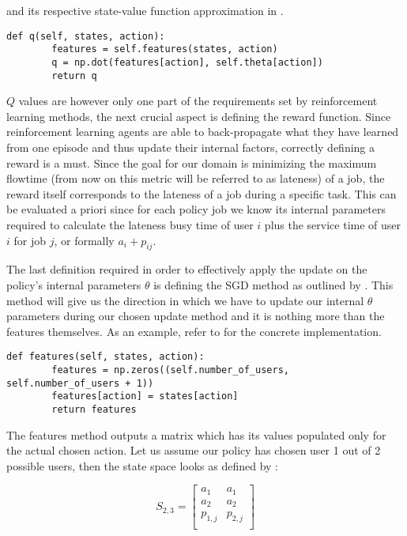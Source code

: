 \documentclass{seal_thesis}
\begin{document}
and its respective state-value function approximation in .

\begin{lstlisting}[caption=State-value function approximation,label=lst:value_f_approx,style=CustomPython]
    def q(self, states, action):
        features = self.features(states, action)
        q = np.dot(features[action], self.theta[action])
        return q
\end{lstlisting}
 
 $Q$ values are however only one part of the requirements set by reinforcement learning methods, the next crucial aspect is defining the reward function. Since reinforcement learning agents are able to back-propagate what they have learned from one episode and thus update their internal factors, correctly defining a reward is a must. Since the goal for our domain is minimizing the maximum flowtime (from now on this metric will be referred to as lateness) of a job, the reward itself corresponds to the lateness of a job during a specific task. This can be evaluated a priori since for each policy job we know its internal parameters required to calculate the lateness \ie busy time of user $i$ plus the service time of user $i$ for job $j$, or formally $a_i+p_{ij}$.

 The last definition required in order to effectively apply the update on the policy's internal parameters $\theta$ is defining the SGD method as outlined by . This method will give us the direction in which we have to update our internal $\theta$ parameters during our chosen update method and it is nothing more than the features themselves. As an example, refer to  for the concrete implementation.

 \begin{lstlisting}[caption=Features definition,label=lst:features_definition,style=CustomPython]
    def features(self, states, action):
        features = np.zeros((self.number_of_users, self.number_of_users + 1))
        features[action] = states[action]
        return features
\end{lstlisting}

The features method outputs a matrix which has its values populated only for the actual chosen action. Let us assume our policy has chosen user 1 out of 2 possible users, then the state space looks as defined by :

\begin{equation}
\label{eq:kbatch_sp_ex}
	S_{2,3} = 
	\begin{bmatrix}
	a_1 & a_1 \\
	a_2 & a_2 \\
	p_{1,j} & p_{2,j} \\
	\end{bmatrix}
\end{equation}
\end{document}
